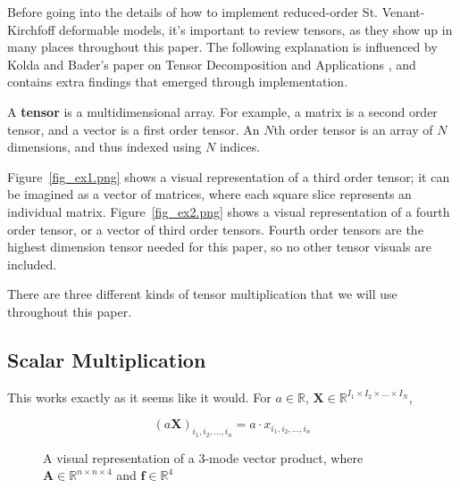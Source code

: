 \documentclass[twocolumn,10pt]{asme2ej}
\begin{document}
Before going into the details of how to implement reduced-order St. Venant-Kirchfoff deformable models, it's important to review tensors, as they show up in many places throughout this paper. The following explanation is influenced by Kolda and Bader's paper on Tensor Decomposition and Applications \cite{tensors}, and contains extra findings that emerged through implementation.

A \textbf{tensor} is a multidimensional array. For example, a matrix is a second order tensor, and a vector is a first order tensor. An $N$th order tensor is an array of $N$ dimensions, and thus indexed using $N$ indices.

Figure~\ref{fig_ex1.png} shows a visual representation of a third order tensor; it can be imagined as a vector of matrices, where each square slice represents an individual matrix. Figure~\ref{fig_ex2.png} shows a visual representation of a fourth
order tensor, or a vector of third order tensors. Fourth order tensors are the highest dimension tensor needed for this paper, so no other tensor visuals are included.

There are three different kinds of tensor multiplication that we will use throughout this paper.

\subsection{Scalar Multiplication}

This works exactly as it seems like it would. For $a \in \mathbb{R}$, $\bm{X} \in \mathbb{R}^{I_1 \times I_2 \times ... \times I_N}$,

\begin{equation}
(a\bm{X})_{i_1, i_2, ..., i_n} = a\cdot x_{i_1, i_2, ..., i_n}
\end{equation}

\begin{figure}
\caption{A visual representation of a 3-mode vector product, where $\bm{A} \in \mathbb{R}^{n \times n \times 4}$ and $\bm{f} \in \mathbb{R}^{4}$}
\label{fig_ex3.png}
\end{figure}
\end{document}
